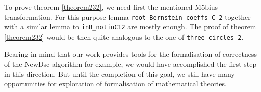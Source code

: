 \documentclass[11pt, a4paper]{article}
\begin{document}
To prove theorem \ref{theorem232}, we need first the mentioned M\"obius transformation. For this purpose lemma \lstinline!root_Bernstein_coeffs_C_2! together with a similar lemma to \lstinline!inB_notinC12! are mostly enough. The proof of theorem \ref{theorem232} would be then quite analogous to the one of \lstinline!three_circles_2!.

Bearing in mind that our work provides tools for the formalisation of correctness of the NewDsc algorithm for example, we would have accomplished the first step in this direction. But until the completion of this goal, we still have many opportunities for exploration of formalisation of mathematical theories.


%



\end{document}

